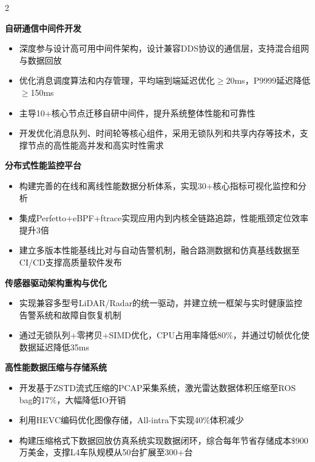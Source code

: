 \documentclass[10pt,a4paper,ragged2e,withhyper]{altacv}
\begin{document}
\begin{paracol}{2}



\textbf{自研通信中间件开发}
\begin{itemize}
\item 深度参与设计高可用中间件架构，设计兼容DDS协议的通信层，支持混合组网与数据回放
\item 优化消息调度算法和内存管理，平均端到端延迟优化$\geq$20ms，P9999延迟降低$\geq$150ms
\item 主导10+核心节点迁移自研中间件，提升系统整体性能和可靠性
\item 开发优化消息队列、时间轮等核心组件，采用无锁队列和共享内存等技术，支撑节点的高性能高并发和高实时性需求
\end{itemize}

\textbf{分布式性能监控平台}
\begin{itemize}
\item 构建完善的在线和离线性能数据分析体系，实现30+核心指标可视化监控和分析
\item 集成Perfetto+eBPF+ftrace实现应用内到内核全链路追踪，性能瓶颈定位效率提升3倍
\item 建立多版本性能基线比对与自动告警机制，融合路测数据和仿真基线数据至CI/CD支撑高质量软件发布
\end{itemize}

\textbf{传感器驱动架构重构与优化}
\begin{itemize}
\item 实现兼容多型号LiDAR/Radar的统一驱动，并建立统一框架与实时健康监控告警系统和故障自恢复机制 
\item 通过无锁队列+零拷贝+SIMD优化，CPU占用率降低80\%，并通过切帧优化使数据延迟降低35ms
\end{itemize}

\textbf{高性能数据压缩与存储系统}
\begin{itemize}
\item 开发基于ZSTD流式压缩的PCAP采集系统，激光雷达数据体积压缩至ROS bag的17\%，大幅降低IO开销
\item 利用HEVC编码优化图像存储，All-intra下实现40\%体积减少
\item 构建压缩格式下数据回放仿真系统实现数据闭环，综合每年节省存储成本\$900万美金，支撑L4车队规模从50台扩展至300+台
\end{itemize}


\end{paracol}
\end{document}
